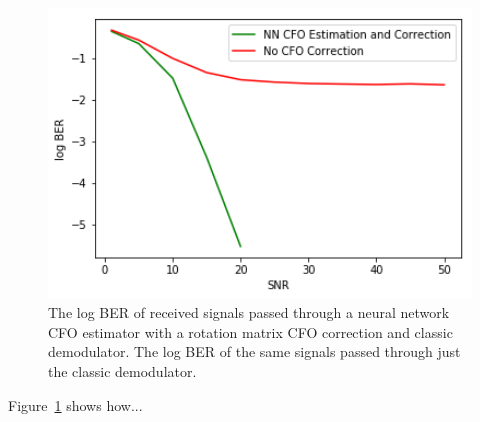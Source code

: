 \begin{figure}
\begin{center}
\includegraphics[width=12cm]{figures/cfo/cfo_estimation.png}
\caption{The log BER of received signals passed through a neural network CFO estimator with a rotation matrix CFO correction and classic demodulator. The log BER of the same signals passed through just the classic demodulator.}
\label{fig:cfo_est}
\end{center}
\end{figure}

Figure~\ref{fig:cfo_est} shows how...

